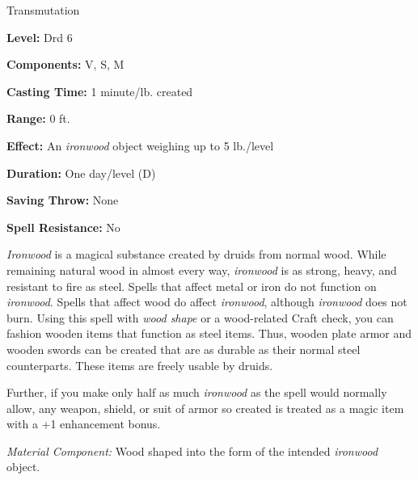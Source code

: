 
Transmutation

\textbf{Level:} Drd 6

\textbf{Components:} V, S, M

\textbf{Casting Time:} 1 minute/lb. created

\textbf{Range:} 0 ft.

\textbf{Effect:} An \textit{ironwood} object weighing up to 5 lb./level

\textbf{Duration:} One day/level (D)

\textbf{Saving Throw:} None

\textbf{Spell Resistance:} No

\textit{Ironwood} is a magical substance created by druids from normal wood. While 
remaining natural wood in almost every way, \textit{ironwood} is as strong, heavy, 
and resistant to fire as steel. Spells that affect metal or iron do not function 
on \textit{ironwood}. Spells that affect wood do affect \textit{ironwood}, although 
\textit{ironwood} does not burn. Using this spell with \textit{wood shape} or a 
wood-related Craft check, you can fashion wooden items that function as steel items. 
Thus, wooden plate armor and wooden swords can be created that are as durable as 
their normal steel counterparts. These items are freely usable by druids.

Further, if you make only half as much \textit{ironwood} as the spell would normally 
allow, any weapon, shield, or suit of armor so created is treated as a magic item 
with a +1 enhancement bonus.

\textit{Material Component:} Wood shaped into the form of the intended \textit{ironwood 
}object.

